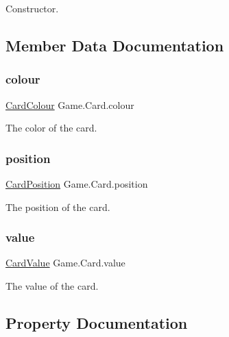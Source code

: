 Constructor. 

\subsection{Member Data Documentation}
\mbox{\label{class_game_1_1_card_a6b201acd3a84a137384c52303de942d2}} 
\subsubsection{\texorpdfstring{colour}{colour}}
{\footnotesize\ttfamily \hyperlink{class_game_1_1_card_a76a5a259d3d61f379fb2354192753789}{Card\+Colour} Game.\+Card.\+colour}

The color of the card. \mbox{\label{class_game_1_1_card_abf7379cf3858aa12e7ffb3440156a0d7}} 
\subsubsection{\texorpdfstring{position}{position}}
{\footnotesize\ttfamily \hyperlink{class_game_1_1_card_a9b35cee58d08386bc6f1d3cc7e6c6999}{Card\+Position} Game.\+Card.\+position}

The position of the card. \mbox{\label{class_game_1_1_card_aa59c1833ffad11e084d5ebb552a4698e}} 
\subsubsection{\texorpdfstring{value}{value}}
{\footnotesize\ttfamily \hyperlink{class_game_1_1_card_a17c2bb5fb12e206639e218492d78578a}{Card\+Value} Game.\+Card.\+value}

The value of the card. 

\subsection{Property Documentation}
\mbox{\label{class_game_1_1_card_afaad8a7eae5f1e7df1cde0428e470179}} 
